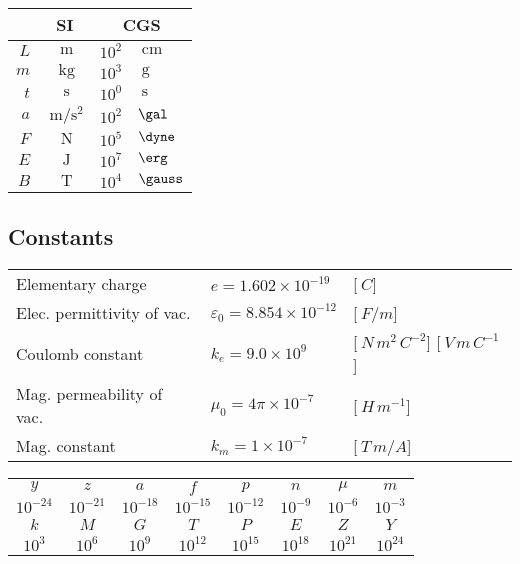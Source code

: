 \documentclass{form}
\newcommand{\expnumber}[2]{{#1}\times 10^{#2}} %
\begin{document}
\begin{minipage}[c]{0.74\textwidth}
	\begin{minipage}[c]{0.31\textwidth}
		\begin{center}
			\begin{tabular}{r | c | r l} \hline \hline
		       	 	& \textbf{SI}     & \multicolumn{2}{c}{\textbf{CGS}} \\ \hline
				$L$ & $\SI{}{\metre                }$ & $10^2$&$\SI{}{\cm}$ \\
				$m$ & $\SI{}{\kilogram             }$ & $10^3$&$\SI{}{\gram}$ \\
				$t$ & $\SI{}{\second               }$ & $10^0$&$\SI{}{\second}$ \\
				$a$ & $\SI{}{\metre \per \second ^2}$ & $10^2$&$\SI{}{\gal}$ \\
				$F$ & $\SI{}{\newton               }$ & $10^5$&$\SI{}{\dyne}$ \\
				$E$ & $\SI{}{\joule                }$ & $10^7$&$\SI{}{\erg}$ \\
				$B$ & $\SI{}{\tesla                }$ & $10^4$&$\SI{}{\gauss}$ \\ \hline \hline
			\end{tabular}
		\end{center}
	\end{minipage}%
	\begin{minipage}[c]{0.69\textwidth}
		\begin{center}
			\section*{Constants}
			\begin{tabular}{ l l p{20mm} }
				Elementary charge & $e = \expnumber{1.602}{-19}$ & [$\SI{}{C}$]\\
				Elec. permittivity of vac. & $\varepsilon_0=\expnumber{8.854}{-12}$ & [$\SI{}{F/m}$] \\
				Coulomb constant & $k_e=\expnumber{9.0}{9}$ & [$\SI{}{N \, m^2 \, C^{-2}}$] [$\SI{}{V\,m\,C^{-1}}$]\\
				Mag. permeability of vac. & $\mu_0=\expnumber{4\pi}{-7}$ & [$\SI{}{H\,m^{-1}}$] \\
				Mag. constant & $k_m=\expnumber{1}{-7}$ & [$\SI{}{T\,m/A}$]
			\end{tabular}
		\end{center}
	\end{minipage}
	\begin{center}
		\begin{tabular}{c | c | c | c | c | c | c | c}
			$y$ & $z$ & $a$ & $f$ & $p$ & $n$ & $\mu$ & $m$ \\
			$10^{-24}$ &$10^{-21}$ &$10^{-18}$ & $10^{-15}$ & $10^{-12}$ & $10^{-9}$ & $10^{-6}$ & $10^{-3}$ \\ \hline \hline
			$k$ & $M$ & $G$ & $T$ & $P$ & $E$ & $Z$ & $Y$ \\
			$10^{3}$ &$10^{6}$ &$10^{9}$ &$10^{12}$ & $10^{15}$ &$10^{18}$ &$10^{21}$ &$10^{24}$
		\end{tabular}
	\end{center}
\end{minipage}\\ \\ \\
\end{document}
